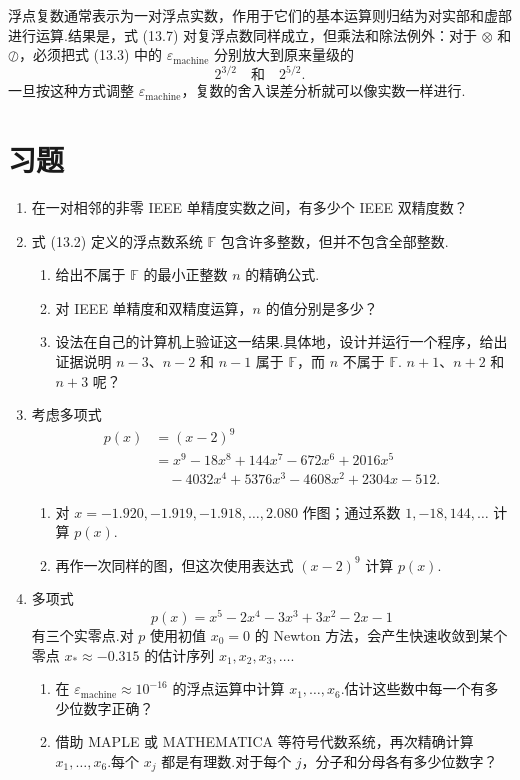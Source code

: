 \documentclass[UTF8,fontset=none,12pt]{ctexart}
\newcommand{\F}{\mathbb{F}}
\newcommand{\epsmach}{\varepsilon_{\mathrm{machine}}}
\theoremstyle{definition}
\begin{document}
浮点复数通常表示为一对浮点实数，作用于它们的基本运算则归结为对实部和虚部进行运算.结果是，式 (13.7) 对复浮点数同样成立，但乘法和除法例外：对于 $\otimes$ 和 $\oslash$，必须把式 (13.3) 中的 $\epsmach$ 分别放大到原来量级的
\[
    2^{3/2}\quad\text{和}\quad 2^{5/2}.
\]
一旦按这种方式调整 $\epsmach$，复数的舍入误差分析就可以像实数一样进行.

\section*{习题}

\begin{enumerate}[label=\textbf{13.\arabic*}]
    \item 在一对相邻的非零 IEEE 单精度实数之间，有多少个 IEEE 双精度数？

    \item 式 (13.2) 定义的浮点数系统 $\F$ 包含许多整数，但并不包含全部整数.
    \begin{enumerate}[label=(\alph*)]
        \item 给出不属于 $\F$ 的最小正整数 $n$ 的精确公式.
        \item 对 IEEE 单精度和双精度运算，$n$ 的值分别是多少？
        \item 设法在自己的计算机上验证这一结果.具体地，设计并运行一个程序，给出证据说明 $n-3$、$n-2$ 和 $n-1$ 属于 $\F$，而 $n$ 不属于 $\F$. $n+1$、$n+2$ 和 $n+3$ 呢？
    \end{enumerate}

    \item 考虑多项式
    \begin{equation*}
    \begin{aligned}
        p(x)&=(x-2)^9\\
        &=x^9-18x^8+144x^7-672x^6+2016x^5\\
        &\quad-4032x^4+5376x^3-4608x^2+2304x-512.
    \end{aligned}
    \end{equation*}
    \begin{enumerate}[label=(\alph*)]
        \item 对 $x=-1.920,-1.919,-1.918,\ldots,2.080$ 作图；通过系数 $1,-18,144,\ldots$ 计算 $p(x)$.
        \item 再作一次同样的图，但这次使用表达式 $(x-2)^9$ 计算 $p(x)$.
    \end{enumerate}

    \item 多项式
    \[
        p(x)=x^5-2x^4-3x^3+3x^2-2x-1
    \]
    有三个实零点.对 $p$ 使用初值 $x_0=0$ 的 Newton 方法，会产生快速收敛到某个零点 $x_*\approx-0.315$ 的估计序列 $x_1,x_2,x_3,\ldots$.
    \begin{enumerate}[label=(\alph*)]
        \item 在 $\epsmach\approx10^{-16}$ 的浮点运算中计算 $x_1,\ldots,x_6$.估计这些数中每一个有多少位数字正确？
        \item 借助 MAPLE 或 MATHEMATICA 等符号代数系统，再次精确计算 $x_1,\ldots,x_6$.每个 $x_j$ 都是有理数.对于每个 $j$，分子和分母各有多少位数字？
    \end{enumerate}
\end{enumerate}
\end{document}
